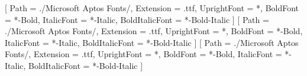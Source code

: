 
\usepackage{fontspec}
\setmainfont{Aptos}[
    Path = ./Microsoft Aptos Fonts/,
    Extension = .ttf,
    UprightFont = *,
    BoldFont = *-Bold,
    ItalicFont = *-Italic,
    BoldItalicFont = *-Bold-Italic
]
\setsansfont{Aptos}[
    Path = ./Microsoft Aptos Fonts/,
    Extension = .ttf,
    UprightFont = *,
    BoldFont = *-Bold,
    ItalicFont = *-Italic,
    BoldItalicFont = *-Bold-Italic
]
\setmonofont{Aptos-Mono}[
    Path = ./Microsoft Aptos Fonts/,
    Extension = .ttf,
    UprightFont = *,
    BoldFont = *-Bold,
    ItalicFont = *-Italic,
    BoldItalicFont = *-Bold-Italic
]
\usepackage[indonesian]{babel} %
\usepackage{geometry}
\usepackage{graphicx}
\usepackage{grffile}
\usepackage{float}
\usepackage[table]{xcolor}
\usepackage{fancyhdr}
\usepackage{titlesec}
\usepackage[titles]{tocloft}
\renewcommand{\cftchapleader}{\hfill}
\renewcommand{\cftsecleader}{\hfill}
\renewcommand{\cftsubsecleader}{\hfill}
\renewcommand{\cftsubsubsecleader}{\hfill}
\renewcommand{\cftfigleader}{\hfill}
\renewcommand{\cfttableader}{\hfill}
\renewcommand{\cftfigpresnum}{Gambar }
\renewcommand{\cfttabpresnum}{Tabel }
\setlength{\cftfignumwidth}{2.5cm}
\setlength{\cfttabnumwidth}{2.5cm}
\usepackage{booktabs}
\usepackage{tabularx}
\usepackage{longtable}
\usepackage{xltabular}
\usepackage{multirow}
\usepackage{seqsplit}
\usepackage{pdflscape}
\usepackage{svg}
\setlength{\LTleft}{0pt}
\setlength{\LTright}{\fill}
\usepackage{array}
\renewcommand{\tabularxcolumn}[1]{m{#1}}
\usepackage{caption}
\usepackage{subcaption}
\usepackage{tikz}
\usepackage{setspace}
\usepackage{enumitem}
\usepackage{amssymb}
\usepackage{pifont}
\newcommand{\cmark}{\scalebox{2.0}{\textcolor{blue}{\ding{51}}}}%
\newcommand{\xmark}{\scalebox{2.0}{\textcolor{red}{\ding{55}}}}%

\let\cleardoublepage\clearpage
\onehalfspacing %
\setlength{\parindent}{0pt} %
\setlength{\parskip}{0.5em}   %
\usepackage{ragged2e}       %
\justifying                   %
\sloppy                      %

